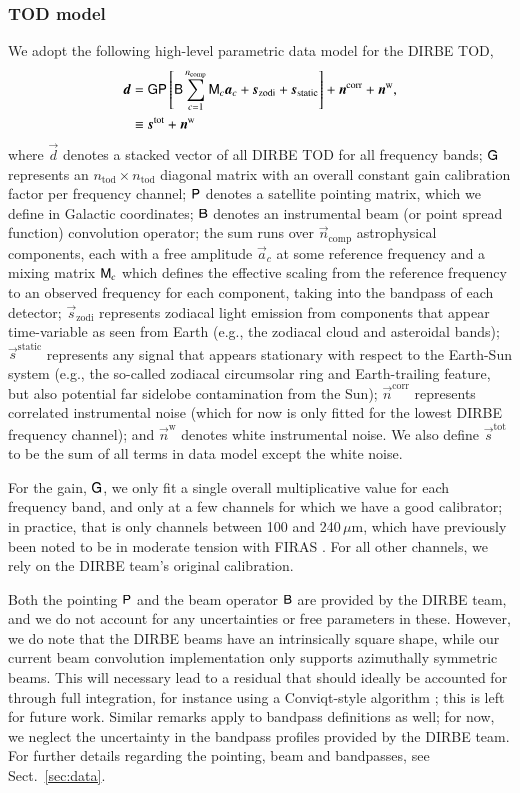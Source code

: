 \documentclass{aa}
\newcommand{\dv}[0]{\vec{d}}
\newcommand{\B}[0]{\tens{B}}
\newcommand{\G}[0]{\tens{G}}
\newcommand{\n}[0]{\vec{n}}
\newcommand{\s}[0]{\vec{s}}
\renewcommand{\a}[0]{\vec{a}}
\newcommand{\M}[0]{\tens{M}}
\renewcommand{\P}[0]{\tens{P}}
\begin{document}
\subsubsection{TOD model}

We adopt the following high-level parametric data model for the DIRBE
TOD,
\begin{align}
	\label{eq:model}
	\dv &=\G\P\left[\B\sum_{c=1}^{n_{\mathrm{comp}}}\M_c\a_c+\s_{\mathrm{zodi}} +
          \s_{\mathrm{static}}\right] + \n^\mathrm{corr} + \n^\mathrm w,\\
        &\equiv \s^{\mathrm{tot}} + \n^{\mathrm{w}}
\end{align}
where $\dv$ denotes a stacked vector of all DIRBE TOD for all
frequency bands; $\G$ represents an $n_{\mathrm{tod}}\times
n_{\mathrm{tod}}$ diagonal matrix with an overall constant gain
calibration factor per frequency channel; $\P$ denotes a satellite
pointing matrix, which we define in Galactic coordinates; $\B$ denotes
an instrumental beam (or point spread function) convolution operator;
the sum runs over $\n_{\mathrm{comp}}$ astrophysical components, each
with a free amplitude $\a_c$ at some reference frequency and a mixing
matrix $\M_c$ which defines the effective scaling from the reference
frequency to an observed frequency for each component, taking into the
bandpass of each detector; $\s_{\mathrm{zodi}}$ represents zodiacal
light emission from components that appear time-variable as seen from
Earth (e.g., the zodiacal cloud and asteroidal bands);
$\s^{\mathrm{static}}$ represents any signal that appears stationary
with respect to the Earth-Sun system (e.g., the so-called zodiacal
circumsolar ring and Earth-trailing feature, but also potential far
sidelobe contamination from the Sun); $\n^{\mathrm{corr}}$ represents
correlated instrumental noise (which for now is only fitted for the
lowest DIRBE frequency channel); and $\n^{\mathrm{w}}$ denotes white
instrumental noise. We also define $\s^{\mathrm{tot}}$ to be the sum
of all terms in data model except the white noise.

For the gain, $\G$, we only fit a single overall multiplicative value for each
frequency band, and only at a few channels for which we have a good calibrator;
in practice, that is only channels between 100 and 240\,$\mu$m, which have
previously been noted to be in moderate tension with FIRAS \citep{fixsen1997}.
For all other channels, we rely on the DIRBE team's original calibration.

Both the pointing $\P$ and the beam operator $\B$ are provided by the
DIRBE team, and we do not account for any uncertainties or free
parameters in these. However, we do note that the DIRBE beams have an
intrinsically square shape, while our current beam convolution
implementation only supports azimuthally symmetric beams. This will
necessary lead to a residual that should ideally be accounted for
through full integration, for instance using a Conviqt-style
algorithm \citep{prezeau2010,keihanen2012}; this is left for future work. Similar remarks apply to
bandpass definitions as well; for now, we neglect the uncertainty in the bandpass
profiles provided by the DIRBE team. For
further details regarding the pointing, beam and bandpasses, see
Sect.~\ref{sec:data}.
\end{document}
